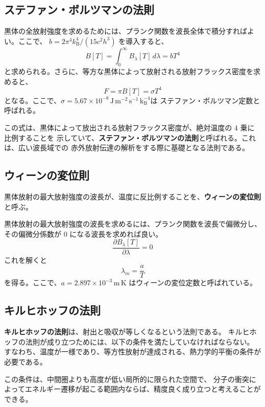 \documentclass[article,twoside]{dennou777}
\newcommand{\Unit}[1]{\,\mathrm{#1}}
\newcommand{\hmemph}[1]{\textbf{#1}}
\begin{document}
\subsection{ステファン・ボルツマンの法則}
黒体の全放射強度を求めるためには、プランク関数を波長全体で積分すればよい。ここで、
$b=2\pi^4k_\mathrm{B}^4/(15c^2h^3)$ を導入すると、
\begin{equation}
	B[T]=\int^\infty_0 B_\lambda[T]\,d\lambda=bT^4
\end{equation}
と求められる。さらに、等方な黒体によって放射される放射フラックス密度を求めると、
\begin{equation}
	F=\pi B[T]=\sigma T^4
\end{equation}
となる。ここで、$\sigma=5.67\times10^{-8}\Unit{J\,m^{-2}\,s^{-1}\,k_\mathrm{B}^{-4}}$は
ステファン・ボルツマン定数と呼ばれる。

この式は、黒体によって放出される放射フラックス密度が、絶対温度の $4$ 乗に比例することを
示していて、\hmemph{ステファン・ボルツマンの法則}と呼ばれる。これは、広い波長域での
赤外放射伝達の解析をする際に基礎となる法則である。

\subsection{ウィーンの変位則}
黒体放射の最大放射強度の波長が、温度に反比例することを、\hmemph{ウィーンの変位則}と呼ぶ。

黒体放射の最大放射強度の波長を求めるには、プランク関数を波長で偏微分し、その偏微分係数が
$0$ になる波長を求めれば良い。
\begin{equation}
	\frac{\partial B_\lambda[T]}{\partial\lambda}=0
\end{equation}
これを解くと
\begin{equation}
	\lambda_m=\frac{a}{T}
\end{equation}
を得る。ここで、$a=2.897\times10^{-3}\Unit{m\,K}$ はウィーンの変位定数と呼ばれている。

\subsection{キルヒホッフの法則}
\hmemph{キルヒホッフの法則}は、射出と吸収が等しくなるという法則である。
キルヒホッフの法則が成り立つためには、以下の条件を満たしていなければならない。
すなわち、温度が一様であり、等方性放射が達成される、熱力学的平衡の条件が必要である。

この条件は、中間圏よりも高度が低い局所的に限られた空間で、
分子の衝突によってエネルギー遷移が起こる範囲内ならば、精度良く成り立つと考えることができる。
\end{document}
